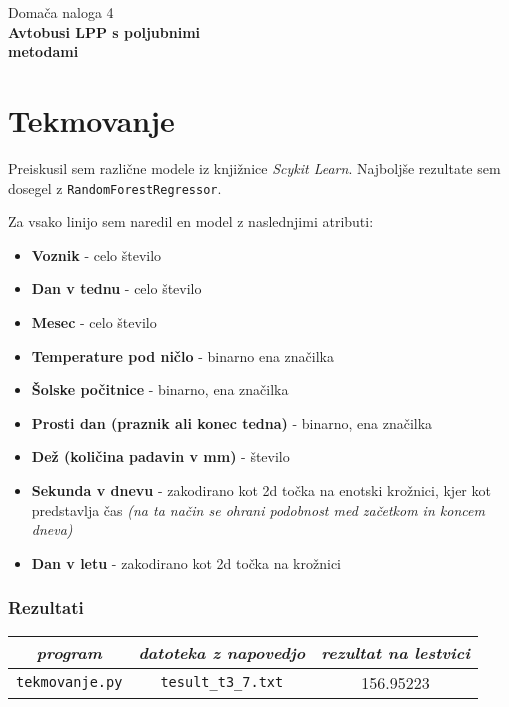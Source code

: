 \documentclass[11pt,a4paper]{article}
\begin{document}
{\huge Domača naloga 4} \\
{\Huge \textbf{Avtobusi LPP s poljubnimi\\ metodami}} \\

\section*{Tekmovanje}

Preiskusil sem različne modele iz knjižnice \textit{Scykit Learn}. Najboljše rezultate sem dosegel z \texttt{RandomForestRegressor}.

Za vsako linijo sem naredil en model z naslednjimi atributi:
\begin{itemize}
	\item \textbf{Voznik} - celo število
	\item \textbf{Dan v tednu} - celo število
	\item \textbf{Mesec} - celo število
	\item \textbf{Temperature pod ničlo} - binarno ena značilka
	\item \textbf{Šolske počitnice} - binarno, ena značilka
	\item \textbf{Prosti dan (praznik ali konec tedna)} - binarno, ena značilka
	\item \textbf{Dež (količina padavin v mm)} - število
	\item \textbf{Sekunda v dnevu} - zakodirano kot 2d točka na enotski krožnici, kjer kot predstavlja čas \textit{(na ta način se ohrani podobnost med začetkom in koncem dneva)}
	\item \textbf{Dan v letu} - zakodirano kot 2d točka na krožnici
\end{itemize}


\subsubsection*{Rezultati}
\begin{center}
	\begin{tabular}{c | c | c}
		\textit{program} & \textit{datoteka z napovedjo} & \textit{rezultat na lestvici} \\ \hline
		\texttt{tekmovanje.py} & \texttt{tesult\_t3\_7.txt} & 156.95223 
	\end{tabular}
\end{center}
\end{document}
